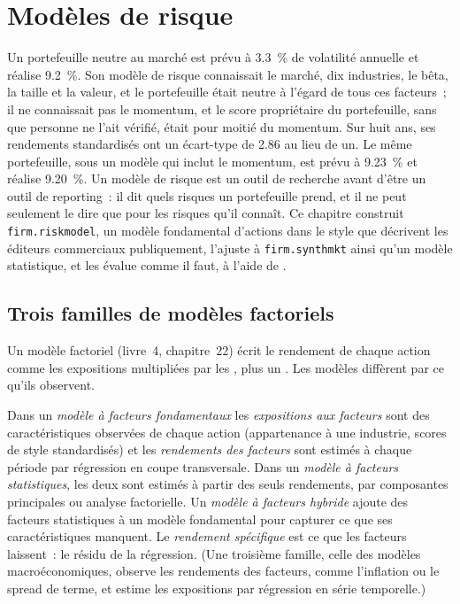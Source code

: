 \chapter{Modèles de risque}\label{ch:rs:risk-models}

Un portefeuille neutre au marché est prévu à 3.3~\% de volatilité annuelle et réalise 9.2~\%. Son modèle de risque connaissait le marché, dix industries, le bêta, la taille et la valeur,
et le portefeuille était neutre à l'égard de tous ces facteurs~; il ne connaissait pas le momentum, et le score propriétaire du portefeuille, sans que personne ne l'ait vérifié, était pour moitié du momentum. Sur
huit ans, ses rendements standardisés ont un écart-type de 2.86 au lieu de un. Le même portefeuille, sous un modèle qui inclut le momentum, est prévu à
9.23~\% et réalise 9.20~\%. Un modèle de risque est un outil de recherche avant d'être un outil de reporting~: il dit quels risques un portefeuille prend, et il ne peut
seulement le dire que pour les risques qu'il connaît. Ce chapitre construit \texttt{firm.riskmodel}, un modèle fondamental d'actions dans le style que décrivent les éditeurs commerciaux
publiquement, l'ajuste à \texttt{firm.synthmkt} ainsi qu'un modèle statistique, et les évalue comme il faut, à l'aide de .

\section{Trois familles de modèles factoriels}

Un modèle factoriel (livre~4, chapitre~22) écrit le rendement de chaque action comme les expositions multipliées par les , plus un . Les modèles diffèrent par ce qu'ils observent.

\begin{definition}\label{def:rs:risk-models:families}
Dans un \emph{modèle à facteurs fondamentaux} les \emph{expositions aux facteurs} sont des caractéristiques observées de chaque
action (appartenance à une industrie, scores de style standardisés) et les \emph{rendements des facteurs} sont estimés à chaque période par régression
en coupe transversale. Dans un \emph{modèle à facteurs statistiques}, les deux sont estimés à partir des seuls rendements, par composantes principales ou
analyse factorielle. Un \emph{modèle à facteurs hybride} ajoute des facteurs statistiques à un modèle fondamental pour capturer ce que ses caractéristiques
manquent. Le \emph{rendement spécifique} est ce que les facteurs laissent~: le résidu de la régression. (Une troisième famille, celle des modèles macroéconomiques, observe
les rendements des facteurs, comme l'inflation ou le spread de terme, et estime les expositions par régression en série temporelle.)
\end{definition}


